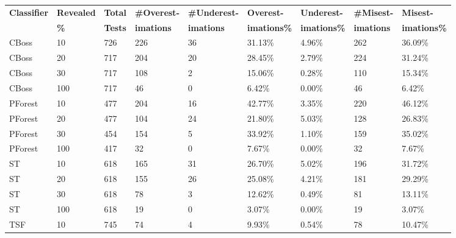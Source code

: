\begin{landscape}
  \begin{table}[hbt!]
    \setlength\extrarowheight{2pt} %
    \begin{tabularx}{\hsize}{|X|X|X|X|X|X|X|X|X|}
    \hline
    \textbf{Classifier} & 
    \textbf{Revealed} & 
    \textbf{Total} & 
    \textbf{\#Overest-} & 
    \textbf{\#Underest-}  & 
    \textbf{Overest-} & 
    \textbf{Underest-} & 
    \textbf{\#Misest-} & 
    \textbf{Misest-} \\
    &
    \textbf{\%} & 
    \textbf{Tests} & 
    \textbf{imations} & 
    \textbf{imations}  & 
    \textbf{imations\%} & 
    \textbf{imations\%} & 
    \textbf{imations}  & 
    \textbf{imations\%}\\
    \hline
    CBoss   & 10 & 726 & 226 & 36 & 31.13\% & 4.96\% & 262 & 36.09\% \\ \hline
    CBoss   & 20 & 717 & 204 & 20 & 28.45\% & 2.79\% & 224 & 31.24\% \\ \hline
    CBoss   & 30 & 717 & 108 & 2 & 15.06\% & 0.28\% & 110 & 15.34\% \\ \hline
    CBoss   & 100 & 717 & 46 & 0 & 6.42\% & 0.00\% & 46 & 6.42\% \\ \hline
    PForest & 10 & 477 & 204 & 16 & 42.77\% & 3.35\% & 220 & 46.12\% \\ \hline
    PForest & 20 & 477 & 104 & 24 & 21.80\% & 5.03\% & 128 & 26.83\% \\ \hline
    PForest & 30 & 454 & 154 & 5 & 33.92\% & 1.10\% & 159 & 35.02\% \\ \hline
    PForest & 100 & 417 & 32 & 0 & 7.67\% & 0.00\% & 32 & 7.67\% \\ \hline
    ST      & 10 & 618 & 165 & 31 & 26.70\% & 5.02\% & 196 & 31.72\% \\ \hline
    ST      & 20 & 618 & 155 & 26 & 25.08\% & 4.21\% & 181 & 29.29\% \\ \hline
    ST      & 30 & 618 & 78 & 3 & 12.62\% & 0.49\% & 81 & 13.11\% \\ \hline
    ST      & 100 & 618 & 19 & 0 & 3.07\% & 0.00\% & 19 & 3.07\% \\ \hline
    TSF     & 10 & 745 & 74 & 4 & 9.93\% & 0.54\% & 78 & 10.47\% \\ \hline

\end{tabularx}
\end{table}
\end{landscape}

